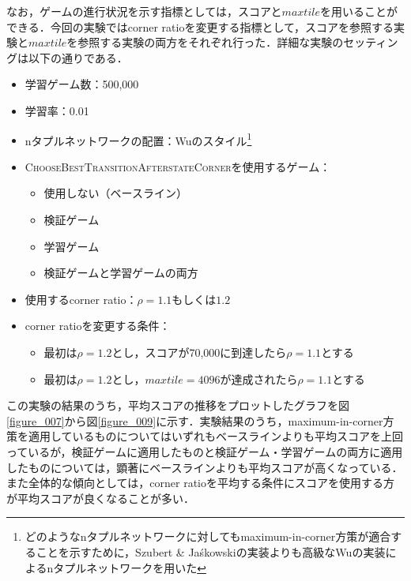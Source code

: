 \documentclass{suribt}
\begin{document}
なお，ゲームの進行状況を示す指標としては，スコアと$maxtile$を用いることができる．今回の実験ではcorner ratioを変更する指標として，スコアを参照する実験と$maxtile$を参照する実験の両方をそれぞれ行った．詳細な実験のセッティングは以下の通りである．

\begin{itemize}
\item 学習ゲーム数：500,000
\item 学習率：0.01
\item nタプルネットワークの配置：Wuのスタイル\footnote{どのようなnタプルネットワークに対してもmaximum-in-corner方策が適合することを示すために，Szubert \& Ja\'{s}kowskiの実装よりも高級なWuの実装によるnタプルネットワークを用いた}
\item \textsc{ChooseBestTransitionAfterstateCorner}を使用するゲーム：
\begin{itemize}
\item 使用しない（ベースライン）
\item 検証ゲーム
\item 学習ゲーム
\item 検証ゲームと学習ゲームの両方
\end{itemize}
\item 使用するcorner ratio：${\rho}=1.1 \text{もしくは} 1.2$
\item corner ratioを変更する条件：
\begin{itemize}
\item 最初は${\rho}=1.2$とし，スコアが70,000に到達したら${\rho}=1.1$とする
\item 最初は${\rho}=1.2$とし，$maxtile=4096$が達成されたら${\rho}=1.1$とする
\end{itemize}
\end{itemize}

この実験の結果のうち，平均スコアの推移をプロットしたグラフを図\ref{figure_007}から図\ref{figure_009}に示す．実験結果のうち，maximum-in-corner方策を適用しているものについてはいずれもベースラインよりも平均スコアを上回っているが，検証ゲームに適用したものと検証ゲーム・学習ゲームの両方に適用したものについては，顕著にベースラインよりも平均スコアが高くなっている．また全体的な傾向としては，corner ratioを平均する条件にスコアを使用する方が平均スコアが良くなることが多い．
\end{document}
